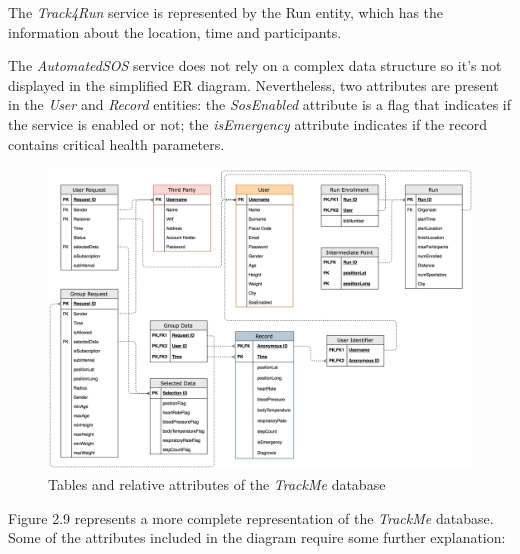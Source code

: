 The \textit{Track4Run} service is represented by the Run entity, which has the information about the location, time and participants.

The \textit{AutomatedSOS} service does not rely on a complex data structure so it’s not displayed in the simplified ER diagram. Nevertheless, two attributes are present in the \textit{User} and \textit{Record} entities: the \textit{SosEnabled} attribute is a flag that indicates if the service is enabled or not; the \textit{isEmergency} attribute indicates if the record contains critical health parameters.

\begin{figure}[H]
\includegraphics[scale=0.17,keepaspectratio]{./Pictures/ER-tables.png}
\centering
\caption{Tables and relative attributes of the \textit{TrackMe} database}
\end{figure}

Figure 2.9 represents a more complete representation of the \textit{TrackMe} database. Some of the attributes included in the diagram require some further explanation:

